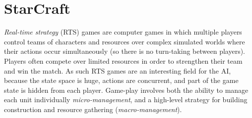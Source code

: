 \section{StarCraft}
\label{sec:sc}

\emph{Real-time strategy} (RTS) games are computer games in which multiple players control teams of characters and resources over complex simulated worlds where their actions occur simultaneously (so there is no turn-taking between players). 
Players often compete over limited resources in order to strengthen their team and win the match. 
As such RTS games are an interesting field for the AI, because the state space is huge, actions are concurrent, and part of the game state is hidden from each player. 
Game-play involves both the ability to manage each unit individually \textit{micro-management}, and a high-level strategy for building construction and resource gathering (\textit{macro-management}). 

